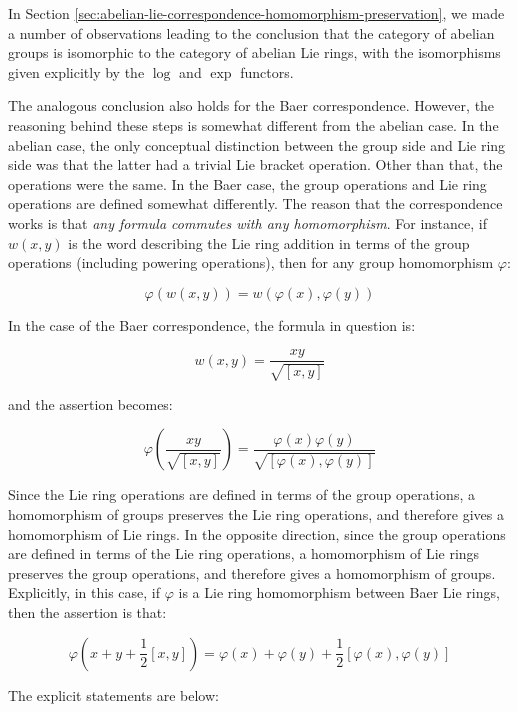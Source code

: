 In Section
\ref{sec:abelian-lie-correspondence-homomorphism-preservation}, we
made a number of observations leading to the conclusion that the
category of abelian groups is isomorphic to the category of abelian
Lie rings, with the isomorphisms given explicitly by the $\log$ and
$\exp$ functors.

The analogous conclusion also holds for the Baer
correspondence. However, the reasoning behind these steps is somewhat
different from the abelian case. In the abelian case, the only
conceptual distinction between the group side and Lie ring side was
that the latter had a trivial Lie bracket operation. Other than that,
the operations were the same. In the Baer case, the group operations
and Lie ring operations are defined somewhat differently. The reason
that the correspondence works is that {\em any formula commutes with
  any homomorphism}. For instance, if $w(x,y)$ is the word describing
the Lie ring addition in terms of the group operations (including
powering operations), then for any group homomorphism $\varphi$:

$$\varphi(w(x,y)) = w(\varphi(x),\varphi(y))$$

In the case of the Baer correspondence, the formula in question is:

$$w(x,y) = \frac{xy}{\sqrt{[x,y]}}$$

and the assertion becomes:

$$\varphi\left(\frac{xy}{\sqrt{[x,y]}}\right) = \frac{\varphi(x)\varphi(y)}{\sqrt{[\varphi(x),\varphi(y)]}}$$

Since the Lie ring operations are defined in terms of the group
operations, a homomorphism of groups preserves the Lie ring
operations, and therefore gives a homomorphism of Lie rings. In the
opposite direction, since the group operations are defined in terms of
the Lie ring operations, a homomorphism of Lie rings preserves the
group operations, and therefore gives a homomorphism of
groups. Explicitly, in this case, if $\varphi$ is a Lie ring
homomorphism between Baer Lie rings, then the assertion is that:

$$\varphi\left(x + y + \frac{1}{2}[x,y]\right) = \varphi(x) + \varphi(y) + \frac{1}{2}[\varphi(x),\varphi(y)]$$

The explicit statements are below:


